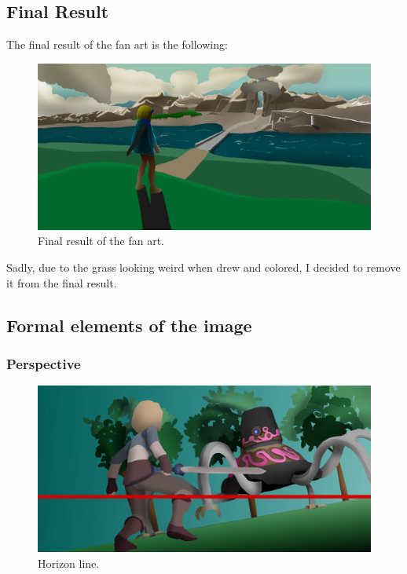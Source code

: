 \documentclass{cup-pan}
\begin{document}
    \subsection{Final Result}
        The final result of the fan art is the following:
        \begin{figure}[H]
            \includegraphics[width=\textwidth]{Imagenes/Fanart1/Color/IIII_Iteracion.png}
            \caption{Final result of the fan art.}
        \end{figure}
        Sadly, due to the grass looking weird when drew and colored, I decided to remove it from the final result.\\

    \subsection{Formal elements of the image}

        \subsubsection{Perspective}

            \begin{figure}[H]
                \includegraphics[width=\textwidth]{Imagenes/Fanart2/Analysis/horizonte.png}
                \caption{Horizon line.}
            \end{figure}
\end{document}
